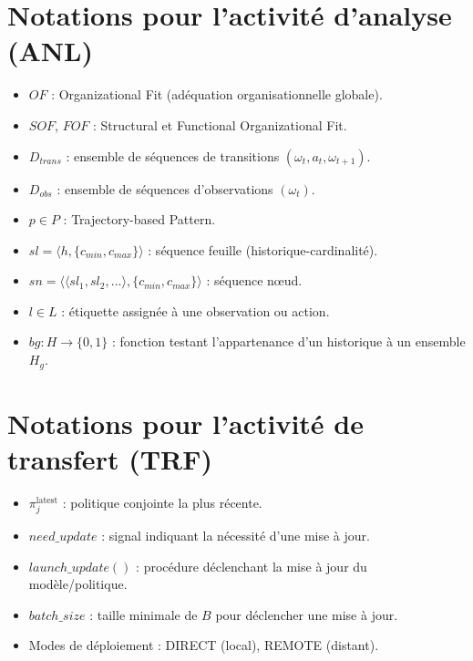 \section{Notations pour l’activité d’analyse (ANL)}

\begin{itemize}
    \item $OF$ : Organizational Fit (adéquation organisationnelle globale).
    \item $SOF$, $FOF$ : Structural et Functional Organizational Fit.
    \item $D_{trans}$ : ensemble de séquences de transitions $(\omega_t, a_t, \omega_{t+1})$.
    \item $D_{obs}$ : ensemble de séquences d’observations $(\omega_t)$.
    \item $p \in P$ : Trajectory-based Pattern.
    \item $sl = \langle h, \{c_{min},c_{max}\}\rangle$ : séquence feuille (historique-cardinalité).
    \item $sn = \langle \langle sl_1, sl_2, ...\rangle, \{c_{min},c_{max}\}\rangle$ : séquence nœud.
    \item $l \in L$ : étiquette assignée à une observation ou action.
    \item $bg : H \to \{0,1\}$ : fonction testant l’appartenance d’un historique à un ensemble $H_g$.
\end{itemize}

\section{Notations pour l’activité de transfert (TRF)}

\begin{itemize}
    \item $\pi^{\text{latest}}_j$ : politique conjointe la plus récente.
    \item $need\_update$ : signal indiquant la nécessité d’une mise à jour.
    \item $launch\_update()$ : procédure déclenchant la mise à jour du modèle/politique.
    \item $batch\_size$ : taille minimale de $B$ pour déclencher une mise à jour.
    \item Modes de déploiement : DIRECT (local), REMOTE (distant).
\end{itemize}


\clearpage
\thispagestyle{empty}
\null
\newpage


